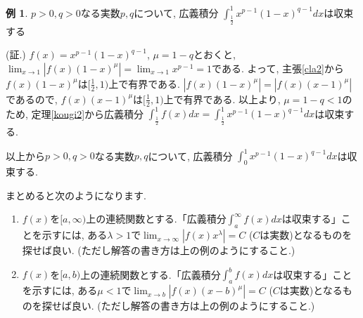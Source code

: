\documentclass[dvipdfmx,a4paper,11pt]{article}
\theoremstyle{definition}
\newtheorem{exa}[thm]{例}
\begin{document}
 \begin{exa}
$p>0, q>0$なる実数$p,q$について, 広義積分
$\int_{\frac{1}{2}}^{1}x^{p-1}(1-x)^{q-1} dx$は収束する

\hspace{-18pt}(証.)
$f(x) = x^{p-1}(1-x)^{q-1}$, $\mu = 1-q$とおくと, $\lim_{x \rightarrow 1} |f(x) (1-x)^{\mu}| =\lim_{x \rightarrow 1} x^{p-1}=1$である.
よって, 主張\ref{cla2}から$f(x)(1-x)^{\mu}$は$[\frac{1}{2},1)$上で有界である.
$|f(x)(1-x)^{\mu}| = |f(x)(x-1)^{\mu}|$であるので, $f(x)(x-1)^{\mu}$は$[\frac{1}{2},1)$上で有界である.
以上より, $\mu=1-q<1$のため, 定理\ref{kougi2}から広義積分
$\int_{\frac{1}{2}}^{1} f(x) dx = \int_{\frac{1}{2}}^{1}x^{p-1}(1-x)^{q-1} dx$は収束する.

 \end{exa}
 以上から$p>0, q>0$なる実数$p,q$について, 広義積分
$\int^{1}_{0}x^{p-1}(1-x)^{q-1} dx$は収束する.

\vspace{11pt}
まとめると次のようになります.
 \begin{tcolorbox}[
    colback = white,
    colframe = green!35!black,
    fonttitle = \bfseries,
    breakable = true]

\begin{enumerate}
\item $f(x)$を$[a,\infty)$上の連続関数とする.「広義積分$\int_{a}^{\infty} f(x)dx $は収束する」ことを示すには, ある$\lambda >1$で$\lim_{x \rightarrow \infty} |f(x) x^{\lambda}|=C$
($C$は実数)となるものを探せば良い. (ただし解答の書き方は上の例のようにすること.)
\item $f(x)$を$[a,b)$上の連続関数とする.「広義積分$\int_{a}^{b} f(x)dx $は収束する」ことを示すには, ある$\mu <1$で$\lim_{x \rightarrow b} |f(x) (x-b)^{\mu}|=C$
($C$は実数)となるものを探せば良い. (ただし解答の書き方は上の例のようにすること.)
\end{enumerate}
 \end{tcolorbox}
 
\end{document}
